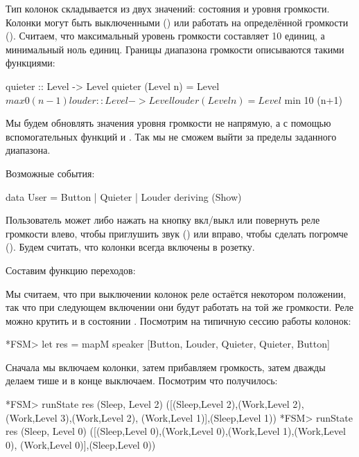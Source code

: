 Тип колонок складывается из двух значений:
состояния и уровня громкости.
Колонки могут быть выключенными () или
работать на определённой громкости ().
Считаем, что максимальный уровень громкости составляет
10 единиц, а минимальный ноль единиц. Границы диапазона 
громкости описываются такими функциями:

\begin{code}
quieter :: Level -> Level
quieter (Level n) = Level $ max 0 (n-1)

louder :: Level -> Level
louder (Level n) = Level $ min 10 (n+1)
\end{code}

Мы будем обновлять значения уровня громкости не напрямую,
а с помощью вспомогательных функций  и .
Так мы не сможем выйти за пределы заданного диапазона.

Возможные события:

\begin{code}
data User = Button | Quieter | Louder
    deriving (Show)
\end{code}

Пользователь может либо нажать на кнопку вкл/выкл или повернуть
реле громкости влево, чтобы приглушить звук () 
или вправо, чтобы сделать погромче (). Будем считать,
что колонки всегда включены в розетку.

Составим функцию переходов:


Мы считаем, что при выключении колонок реле остаётся 
некотором положении, так что при следующем включении
они будут работать на той же громкости. Реле можно крутить
и в состоянии .
Посмотрим на типичную сессию работы колонок:

\begin{code}
*FSM> let res = mapM speaker [Button, Louder, Quieter, Quieter, Button] 
\end{code}

Сначала мы включаем колонки, затем прибавляем громкость, 
затем дважды делаем тише и в конце выключаем. Посмотрим что получилось:


\begin{code}
*FSM> runState res (Sleep, Level 2)
([(Sleep,Level 2),(Work,Level 2),(Work,Level 3),(Work,Level 2),
 (Work,Level 1)],(Sleep,Level 1))
*FSM> runState res (Sleep, Level 0)
([(Sleep,Level 0),(Work,Level 0),(Work,Level 1),(Work,Level 0),
 (Work,Level 0)],(Sleep,Level 0))
\end{code}

